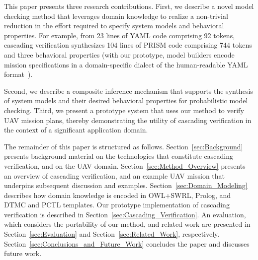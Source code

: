 This paper presents three research contributions. First, we describe a novel model checking method that leverages domain knowledge to realize a non-trivial reduction in the effort required to specify system models and behavioral properties. For example, from 23 lines of YAML code comprising 92 tokens, cascading verification synthesizes 104 lines of PRISM code comprising 744 tokens and three behavioral properties (with our prototype, model builders encode mission specifications in a domain-specific dialect of the human-readable YAML format~\cite{Evans}).

Second, we describe a composite inference mechanism that supports the synthesis of system models and their desired behavioral properties for probabilistic model checking. Third, we present a prototype system that uses our method to verify UAV mission plans, thereby demonstrating the utility of cascading verification in the context of a significant application domain.

The remainder of this paper is structured as follows. Section~\ref{sec:Background} presents background material on the technologies that constitute cascading verification, and on the UAV domain. Section~\ref{sec:Method_Overview} presents an overview of cascading verification, and an example UAV mission that underpins subsequent discussion and examples. Section~\ref{sec:Domain_Modeling} describes how domain knowledge is encoded in OWL+SWRL, Prolog, and DTMC and PCTL templates. Our prototype implementation of cascading verification is described in Section~\ref{sec:Cascading_Verification}. An evaluation, which considers the portability of our method, and related work are presented in Section~\ref{sec:Evaluation} and Section~\ref{sec:Related_Work}, respectively. Section~\ref{sec:Conclusions_and_Future_Work} concludes the paper and discusses future work.
